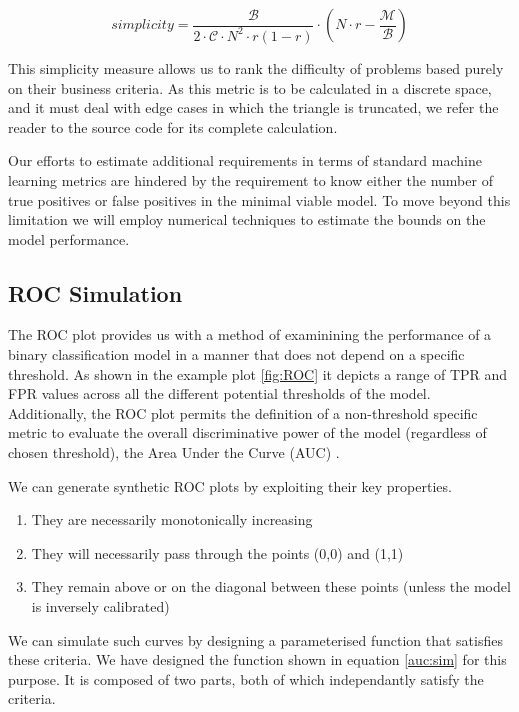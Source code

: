 \documentclass[11pt,a4paper]{article}
\begin{document}
\begin{equation}
simplicity = \frac{\mathcal{B}}{2 \cdot \mathcal{C} \cdot N^2 \cdot r(1-r)} \cdot  \left(N \cdot r - \frac{\mathcal{M}}{\mathcal{B}} \right)
\label{eq:simplicity}
\end{equation}

This simplicity measure allows us to rank the difficulty of problems based purely on their business criteria. 
As this metric is to be
calculated in a discrete space, and it must deal with edge cases in which the triangle is truncated, we refer 
the reader to the source code for its complete calculation.

Our efforts to estimate additional requirements in terms of standard machine learning metrics are hindered by 
the requirement to know
either the number of true positives or false positives in the minimal viable model.
To move beyond this limitation we will employ numerical techniques to estimate the bounds on the model performance.

\subsection{ROC Simulation}

The ROC plot provides us with a method of examinining the performance of a binary classification model
in a manner that does not depend on a specific threshold. As shown in the example plot \ref{fig:ROC}
it depicts a range of TPR and FPR values across all the different potential thresholds of the model.
Additionally, the ROC plot permits the definition of a non-threshold specific metric to evaluate the overall
discriminative power of the model (regardless of chosen threshold), the Area Under the Curve (AUC) \cite{Bradley97}.

We can generate synthetic ROC plots by exploiting their key properties.

\begin{enumerate}
        \item They are necessarily monotonically increasing
        \item They will necessarily pass through the points (0,0) and (1,1)
        \item They remain above or on the diagonal between these points (unless the model is inversely calibrated)
\end{enumerate}

We can simulate such curves by designing a parameterised function that satisfies these
criteria. We have designed the function shown in equation \ref{auc:sim} for this purpose.
It is composed of two parts, both of which independantly satisfy the criteria.
\end{document}
